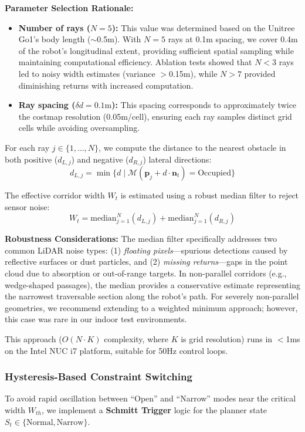 \documentclass[lettersize,journal]{IEEEtran}
\begin{document}
\textbf{Parameter Selection Rationale:}
\begin{itemize}
\item \textbf{Number of rays ($N=5$):} This value was determined based on the Unitree Go1's body length ($\sim$0.5m). With $N=5$ rays at 0.1m spacing, we cover 0.4m of the robot's longitudinal extent, providing sufficient spatial sampling while maintaining computational efficiency. Ablation tests showed that $N<3$ rays led to noisy width estimates (variance $>$0.15m), while $N>7$ provided diminishing returns with increased computation.
\item \textbf{Ray spacing ($\delta d = 0.1\text{m}$):} This spacing corresponds to approximately twice the costmap resolution (0.05m/cell), ensuring each ray samples distinct grid cells while avoiding oversampling.
\end{itemize}

For each ray $j \in \{1,\dots,N\}$, we compute the distance to the nearest obstacle in both positive ($d_{L,j}$) and negative ($d_{R,j}$) lateral directions:
\begin{equation}
d_{L,j} = \min \{d \mid \mathcal{M}(\mathbf{p}_j + d \cdot \mathbf{n}_t) = \text{Occupied} \}
\end{equation}

The effective corridor width $W_t$ is estimated using a robust median filter to reject sensor noise:
\begin{equation}
W_t = \text{median}_{j=1}^N (d_{L,j}) + \text{median}_{j=1}^N (d_{R,j})
\end{equation}

\textbf{Robustness Considerations:} The median filter specifically addresses two common LiDAR noise types: (1) \textit{floating pixels}---spurious detections caused by reflective surfaces or dust particles, and (2) \textit{missing returns}---gaps in the point cloud due to absorption or out-of-range targets. In non-parallel corridors (e.g., wedge-shaped passages), the median provides a conservative estimate representing the narrowest traversable section along the robot's path. For severely non-parallel geometries, we recommend extending to a weighted minimum approach; however, this case was rare in our indoor test environments.

This approach ($O(N \cdot K)$ complexity, where $K$ is grid resolution) runs in $<$1ms on the Intel NUC i7 platform, suitable for 50Hz control loops.

\subsubsection{Hysteresis-Based Constraint Switching}
To avoid rapid oscillation between ``Open'' and ``Narrow'' modes near the critical width $W_{th}$, we implement a \textbf{Schmitt Trigger} logic for the planner state $S_t \in \{\text{Normal}, \text{Narrow}\}$. 
\end{document}
